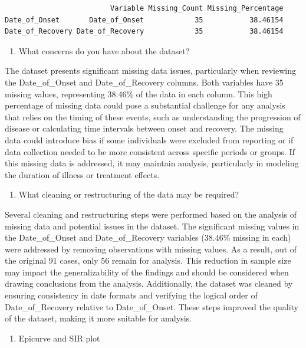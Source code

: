 \documentclass[
  letterpaper,
  DIV=11,
  numbers=noendperiod]{scrartcl}
\providecommand{\tightlist}{%
  \setlength{\itemsep}{0pt}\setlength{\parskip}{0pt}}\usepackage{longtable,booktabs,array}
\begin{document}
\begin{verbatim}
                         Variable Missing_Count Missing_Percentage
Date_of_Onset       Date_of_Onset            35           38.46154
Date_of_Recovery Date_of_Recovery            35           38.46154
\end{verbatim}

\begin{enumerate}
\def\labelenumi{\alph{enumi}.}
\tightlist
\item
  What concerns do you have about the dataset?
\end{enumerate}

The dataset presents significant missing data issues, particularly when
reviewing the Date\_of\_Onset and Date\_of\_Recovery columns. Both
variables have 35 missing values, representing 38.46\% of the data in
each column. This high percentage of missing data could pose a
substantial challenge for any analysis that relies on the timing of
these events, such as understanding the progression of disease or
calculating time intervals between onset and recovery. The missing data
could introduce bias if some individuals were excluded from reporting or
if data collection needed to be more consistent across specific periods
or groups. If this missing data is addressed, it may maintain analysis,
particularly in modeling the duration of illness or treatment effects.

\begin{enumerate}
\def\labelenumi{\alph{enumi}.}
\setcounter{enumi}{1}
\tightlist
\item
  What cleaning or restructuring of the data may be required?
\end{enumerate}

Several cleaning and restructuring steps were performed based on the
analysis of missing data and potential issues in the dataset. The
significant missing values in the Date\_of\_Onset and Date\_of\_Recovery
variables (38.46\% missing in each) were addressed by removing
observations with missing values. As a result, out of the original 91
cases, only 56 remain for analysis. This reduction in sample size may
impact the generalizability of the findings and should be considered
when drawing conclusions from the analysis. Additionally, the dataset
was cleaned by ensuring consistency in date formats and verifying the
logical order of Date\_of\_Recovery relative to Date\_of\_Onset. These
steps improved the quality of the dataset, making it more suitable for
analysis.

\begin{enumerate}
\def\labelenumi{\arabic{enumi}.}
\setcounter{enumi}{1}
\tightlist
\item
  Epicurve and SIR plot
\end{enumerate}
\end{document}
